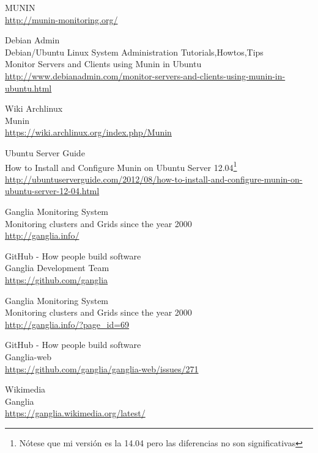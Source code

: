 \begin{thebibliography}{10}
MUNIN\\
  \url{http://munin-monitoring.org/}

Debian Admin\\
Debian/Ubuntu Linux System Administration Tutorials,Howtos,Tips\\
Monitor Servers and Clients using Munin in Ubuntu\\
  \url{http://www.debianadmin.com/monitor-servers-and-clients-using-munin-in-ubuntu.html}

Wiki Archlinux\\
Munin\\
  \url{https://wiki.archlinux.org/index.php/Munin}

Ubuntu Server Guide\\
How to Install and Configure Munin on Ubuntu Server 12.04\footnote{Nótese que mi
versión es la 14.04 pero las diferencias no son significativas}\\
  \url{http://ubuntuserverguide.com/2012/08/how-to-install-and-configure-munin-on-ubuntu-server-12-04.html}


Ganglia Monitoring System\\
Monitoring clusters and Grids since the year 2000\\
  \url{http://ganglia.info/}

GitHub - How people build software\\
Ganglia Development Team\\
  \url{https://github.com/ganglia}

Ganglia Monitoring System\\
Monitoring clusters and Grids since the year 2000\\
  \url{http://ganglia.info/?page_id=69}

GitHub - How people build software\\
Ganglia-web\\
  \url{https://github.com/ganglia/ganglia-web/issues/271}

Wikimedia\\
Ganglia\\
  \url{https://ganglia.wikimedia.org/latest/}



\end{thebibliography}
